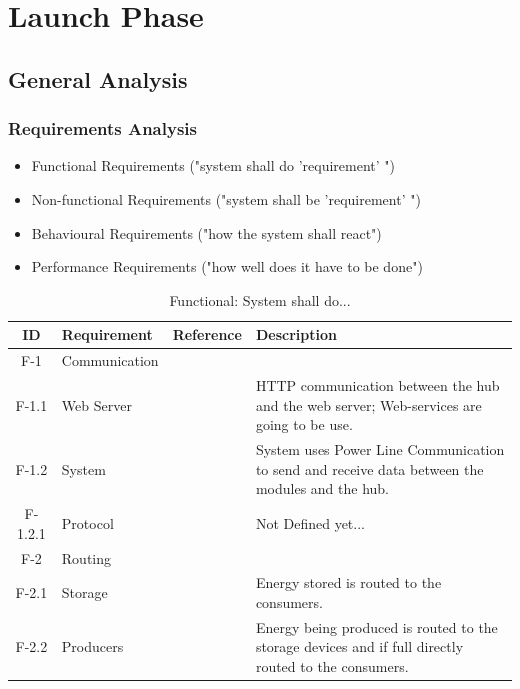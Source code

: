 \newpage
\section{Launch Phase}
\subsection{General Analysis}
	\subsubsection{Requirements	 Analysis}
		\begin{itemize}
			\item Functional Requirements ("system shall do 'requirement' ")
			\item Non-functional Requirements ("system shall be 'requirement' ")
			\item Behavioural Requirements ("how the system shall react")
			\item Performance Requirements ("how well does it have to be done")
		\end{itemize}
		\begin{table}[h!]
		\begin{tabular} [b] {| c |  p{3cm} | c | p{10cm} |}
			\hline
			\textbf{ID} & \textbf{Requirement} & \textbf{Reference} & \textbf{Description} \\\hline
			F-1 & Communication &  &  \\ \hline
			F-1.1 & Web Server &  & HTTP communication between the hub and the web server; Web-services are going to be use. \\ \hline
			F-1.2 & System &  & System uses Power Line Communication to send and receive data between the modules and the hub. \\ \hline
			F-1.2.1 & Protocol &  & Not Defined yet... \\ \hline
			F-2 & Routing &  &  \\ \hline
			F-2.1 & Storage &  & Energy stored is routed to the consumers. \\ \hline
			F-2.2 & Producers &  & Energy being produced is routed to the storage devices and if full directly routed to the consumers. \\ \hline
		\end{tabular}
		\caption{Functional: System shall do...}
		\end{table}
		
